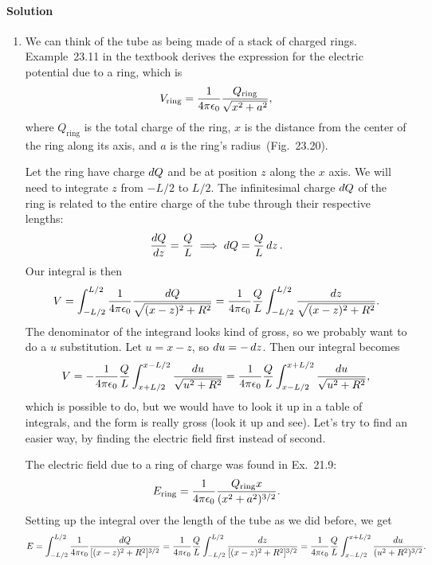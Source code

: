 \documentclass[11pt]{article}
\newcommand{\beq}{\begin{equation*}}
\newcommand{\eeq}{\end{equation*}}
\newenvironment{solution}
{
    \paragraph{Solution}
    \ignorespaces
}
{
    \bigskip
}
\begin{document}
\begin{solution}
	\begin{enumerate}
		\item We can think of the tube as being made of a stack of charged rings.  Example~23.11 in the textbook derives the expression for the electric potential due to a ring, which is
			\beq
				V_\text{ring} = \fk \frac{Q_\text{ring}}{\sqrt{x^2 + a^2}},
			\eeq
			where $Q_\text{ring}$ is the total charge of the ring, $x$ is the distance from the center of the ring along its axis, and $a$ is the ring's radius~(Fig.~23.20).
			

			Let the ring have charge $\dd{Q}$ and be at position $z$ along the $x$ axis.  We will need to integrate $z$ from $-L/2$ to $L/2$.  The infinitesimal charge $\dd{Q}$ of the ring is related to the entire charge of the tube through their respective lengths:
			\beq
				\frac{\dQ}{\dz} = \frac{Q}{L} \implies \dQ = \frac{Q}{L} \dz.
			\eeq
			Our integral is then
			\beq
				V = \int_{-L/2}^{L/2} \fk \frac{\dQ}{\sqrt{(x-z)^2 + R^2}}
				= \fk \frac{Q}{L} \int_{-L/2}^{L/2} \frac{\dz}{\sqrt{(x-z)^2 + R^2}}.
			\eeq
			The denominator of the integrand looks kind of gross, so we probably want to do a $u$ substitution.  Let $u = x - z$, so $\dd{u} = -\dd{z}$.  Then our integral becomes
			\beq
				V = -\fk \frac{Q}{L} \int_{x + L/2}^{x - L/2} \frac{\du}{\sqrt{u^2 + R^2}}
				= \fk \frac{Q}{L} \int_{x - L/2}^{x + L/2} \frac{\du}{\sqrt{u^2 + R^2}},
			\eeq
			which is possible to do, but we would have to look it up in a table of integrals, and the form is really gross (look it up and see).  Let's try to find an easier way, by finding the electric field first instead of second.
			
			The electric field due to a ring of charge was found in Ex.~21.9:
			\beq
				E_\text{ring} = \fk \frac{Q_\text{ring} x}{(x^2 + a^2)^{3/2}}.
			\eeq
			Setting up the integral over the length of the tube as we did before, we get
			\beq
				E = \int_{-L/2}^{L/2} \fk \frac{\dQ}{[(x-z)^2 + R^2]^{3/2}}
				= \fk \frac{Q}{L} \int_{-L/2}^{L/2} \frac{\dz}{[(x-z)^2 + R^2]^{3/2}}
				= \fk \frac{Q}{L} \int_{x - L/2}^{x + L/2} \frac{\du}{(u^2 + R^2)^{3/2}}.
			\eeq
			

\end{enumerate}
\end{solution}
\end{document}
